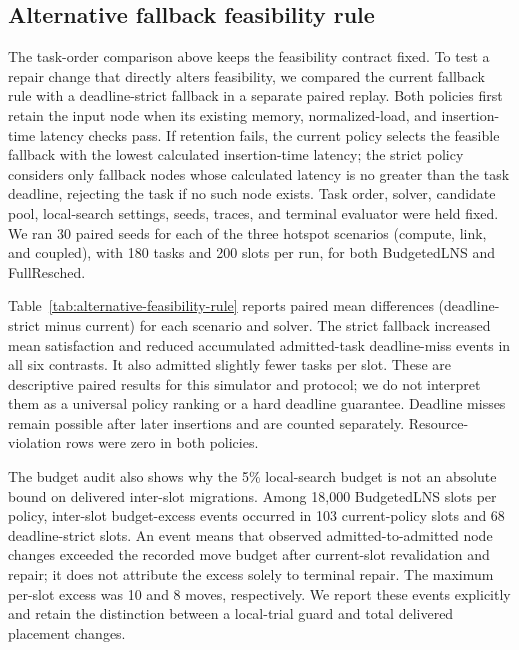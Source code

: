 \documentclass[preprint,12pt]{elsarticle}
\begin{document}
\subsection{Alternative fallback feasibility rule}\label{alternative-feasibility-rule}

The task-order comparison above keeps the feasibility contract fixed. To test a repair change that directly alters feasibility, we compared the current fallback rule with a deadline-strict fallback in a separate paired replay. Both policies first retain the input node when its existing memory, normalized-load, and insertion-time latency checks pass. If retention fails, the current policy selects the feasible fallback with the lowest calculated insertion-time latency; the strict policy considers only fallback nodes whose calculated latency is no greater than the task deadline, rejecting the task if no such node exists. Task order, solver, candidate pool, local-search settings, seeds, traces, and terminal evaluator were held fixed. We ran 30 paired seeds for each of the three hotspot scenarios (compute, link, and coupled), with 180 tasks and 200 slots per run, for both BudgetedLNS and FullResched.

Table~\ref{tab:alternative-feasibility-rule} reports paired mean differences (deadline-strict minus current) for each scenario and solver. The strict fallback increased mean satisfaction and reduced accumulated admitted-task deadline-miss events in all six contrasts. It also admitted slightly fewer tasks per slot. These are descriptive paired results for this simulator and protocol; we do not interpret them as a universal policy ranking or a hard deadline guarantee. Deadline misses remain possible after later insertions and are counted separately. Resource-violation rows were zero in both policies.

The budget audit also shows why the 5\% local-search budget is not an absolute bound on delivered inter-slot migrations. Among 18,000 BudgetedLNS slots per policy, inter-slot budget-excess events occurred in 103 current-policy slots and 68 deadline-strict slots. An event means that observed admitted-to-admitted node changes exceeded the recorded move budget after current-slot revalidation and repair; it does not attribute the excess solely to terminal repair. The maximum per-slot excess was 10 and 8 moves, respectively. We report these events explicitly and retain the distinction between a local-trial guard and total delivered placement changes.
\end{document}
